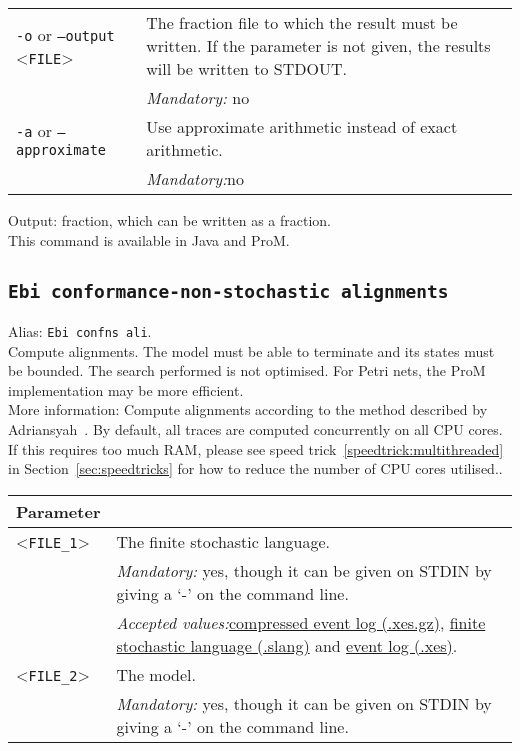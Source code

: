 {\begin{tabularx}{\linewidth}{lX}
\texttt{-o} or \texttt{--output} <\texttt{FILE}> &
The fraction file to which the result must be written. If the parameter is not given, the results will be written to STDOUT.\\
&\textit{Mandatory:} \quad no\\
\texttt{-a} or \texttt{--approximate} & Use approximate arithmetic instead of exact arithmetic.\\
&\textit{Mandatory:}\quad no\\
\bottomrule
\end{tabularx}
\noindent Output: fraction, which can be written as a fraction.
\\This command is available in Java and ProM.
\subsection{\texttt{Ebi conformance-non-stochastic alignments}}
\label{command:Ebi conformance-non-stochastic alignments}
Alias: \texttt{Ebi confns ali}.\\
Compute alignments.
The model must be able to terminate and its states must be bounded. The search performed is not optimised. For Petri nets, the ProM implementation may be more efficient.\\
More information: Compute alignments according to the method described by Adriansyah~\cite{DBLP:conf/edoc/AdriansyahDA11}. By default, all traces are computed concurrently on all CPU cores. If this requires too much RAM, please see speed trick~\ref{speedtrick:multithreaded} in Section~\ref{sec:speedtricks} for how to reduce the number of CPU cores utilised..\\
\begin{tabularx}{\linewidth}{lX}
\toprule
Parameter \\\midrule
<\texttt{FILE\_1}>&The finite stochastic language.\\
&\textit{Mandatory:} \quad yes, though it can be given on STDIN by giving a `-' on the command line.\\
&\textit{Accepted values:}\quad \hyperref[filehandler:compressed event log]{compressed event log (.xes.gz)}, \hyperref[filehandler:finite stochastic language]{finite stochastic language (.slang)} and \hyperref[filehandler:event log]{event log (.xes)}.\\
<\texttt{FILE\_2}>&The model.\\
&\textit{Mandatory:} \quad yes, though it can be given on STDIN by giving a `-' on the command line.\\

\end{tabularx}}
